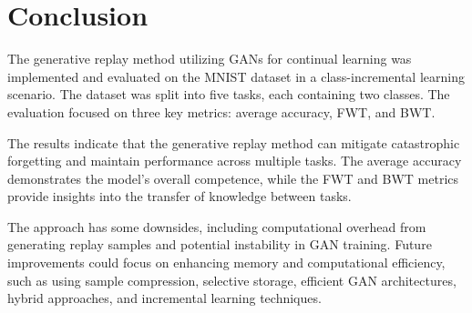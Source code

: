 \documentclass{article}
\begin{document}
\section{Conclusion}
The generative replay method utilizing GANs for continual learning was implemented and evaluated on the MNIST dataset in a class-incremental learning scenario. The dataset was split into five tasks, each containing two classes. The evaluation focused on three key metrics: average accuracy, FWT, and BWT.

The results indicate that the generative replay method can mitigate catastrophic forgetting and maintain performance across multiple tasks. The average accuracy demonstrates the model's overall competence, while the FWT and BWT metrics provide insights into the transfer of knowledge between tasks. 

The approach has some downsides, including computational overhead from generating replay samples and potential instability in GAN training. Future improvements could focus on enhancing memory and computational efficiency, such as using sample compression, selective storage, efficient GAN architectures, hybrid approaches, and incremental learning techniques.

\printbibliography %
\end{document}
